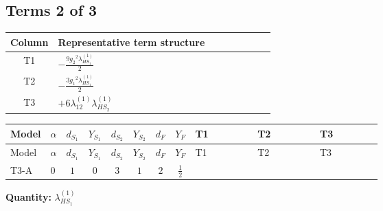 \documentclass[8pt]{article}
\begin{document}
\begin{landscape}
\subsection*{Terms 2 of 3}
\begin{center}
\begin{tabular}{@{}c >{\raggedright\arraybackslash}p{0.82\linewidth}@{}}
\toprule
Column & Representative term structure \\
\midrule
T1 & \(\displaystyle -\frac{9 {g_2}^2 {\lambda_{HS_1}^{(1)}}}{2}\) \\
\midrule
T2 & \(\displaystyle -\frac{3 {g_1}^2 {\lambda_{HS_1}^{(1)}}}{2}\) \\
\midrule
T3 & \(\displaystyle +6 {\lambda_{12}^{(1)}} {\lambda_{HS_2}^{(1)}}\) \\
\midrule
\bottomrule
\end{tabular}
\end{center}
\smallskip
\tiny
\begin{longtable}{@{}llcccccc >{\raggedright\arraybackslash}p{0.21\linewidth} >{\raggedright\arraybackslash}p{0.21\linewidth} >{\raggedright\arraybackslash}p{0.21\linewidth}@{}}
\toprule
Model & $\alpha$ & $d_{S_1}$ & $Y_{S_1}$ & $d_{S_2}$ & $Y_{S_2}$ & $d_F$ & $Y_F$ & T1 & T2 & T3 \\
\midrule
\endfirsthead
\toprule
Model & $\alpha$ & $d_{S_1}$ & $Y_{S_1}$ & $d_{S_2}$ & $Y_{S_2}$ & $d_F$ & $Y_F$ & T1 & T2 & T3 \\
\midrule
\endhead
T3-A & $0$ & $1$ & $0$ & $3$ & $1$ & $2$ & $\frac{1}{2}$ & \scriptsize\adjustbox{max width=\linewidth}{$\begin{gathered} -\frac{9 {g_2}^2 {\lambda_{HS_1}^{(1)}}}{2}\end{gathered}$} & \scriptsize\adjustbox{max width=\linewidth}{$\begin{gathered} -\frac{3 {g_1}^2 {\lambda_{HS_1}^{(1)}}}{2}\end{gathered}$} & \scriptsize\adjustbox{max width=\linewidth}{$\begin{gathered} +6 {\lambda_{12}^{(1)}} {\lambda_{HS_2}^{(1)}}\end{gathered}$} \\
\midrule
\bottomrule
\end{longtable}
\clearpage
\noindent\textbf{Quantity: }$\lambda_{HS_1}^{(1)}$\par\smallskip

\end{landscape}
\end{document}
